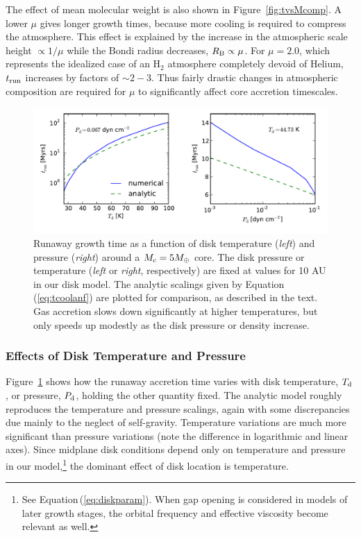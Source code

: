 \documentclass[apj, numberedappendix]{emulateapj}
\newcommand{\Eq}[1]{Equation\,(\ref{#1})}
\newcommand{\Fig}[1]{Figure~\ref{#1}}
\newcommand{\RB}{R_{\rm B}}
\newcommand{\di}{_{\rm d}}
\begin{document}
The effect of mean molecular weight is also shown in \Fig{fig:tvsMcomp}.  A lower $\mu$ gives longer growth times, because more cooling is required to compress the atmosphere.  This effect is explained by the increase in the atmospheric scale height $\propto 1/\mu$ while the Bondi radius decreases, $\RB \propto \mu$.  For $\mu = 2.0$, which represents the idealized case of an H$_2$ atmosphere completely devoid of Helium, $t_{\rm run}$ increases by factors of $\sim 2 - 3$.  Thus fairly drastic changes in atmospheric composition are required for $\mu$ to significantly affect core accretion timescales.

\begin{figure}[tb]
\centering
\includegraphics[width=1.\textwidth]{../../figs/ModelAtmospheres/RadSelfGravPoly/PaperFigs/TdPd_effect.pdf}
\vspace{-0.3in}
\caption{Runaway growth time as a function of disk temperature (\emph{left}) and pressure (\emph{right}) around a $M_{\rm c} = 5 M_{\oplus}$ core.   The disk pressure or temperature (\emph{left} or \emph{right}, respectively) are fixed at values for 10 AU in our disk model.   The analytic scalings given by \Eq{eq:tcoolanf} are plotted for comparison, as described in the text.  Gas accretion slows down significantly at higher temperatures, but only speeds up modestly as the disk pressure or density increase.} 
\label{fig:TPeffects}
\end{figure}


\subsubsection{Effects of Disk Temperature and Pressure}
\label{sec:TPeffects}

\Fig{fig:TPeffects} shows how the runaway accretion time varies with disk temperature, $T\di$, or pressure, $P\di$, holding the other quantity fixed.   The analytic model roughly reproduces the temperature and pressure scalings, again with some discrepancies due mainly to the neglect of self-gravity.  Temperature variations are much more significant than pressure variations (note the difference in logarithmic and linear axes).  Since midplane disk conditions depend only on temperature and pressure in our model,\footnote{See \Eq{eq:diskparam}.  When gap opening is considered in models of later growth stages, the orbital frequency and effective viscosity become relevant as well.} the dominant effect of disk location is temperature.  
\end{document}
